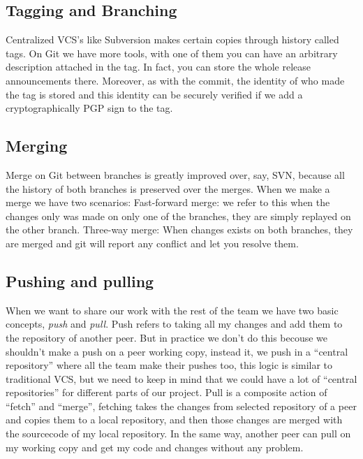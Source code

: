 \documentclass[%
	final,
	notitlepage,
	narroweqnarray,
	inline,
	twoside,
	]{ieee}
\begin{document}

\subsection{Tagging and Branching}


Centralized VCS's like Subversion makes certain copies through history called tags. 
On Git we have more tools, with one of them you can have an arbitrary 
description attached in the tag. In fact, you can store the whole release announcements there. 
Moreover, as with the commit, the identity of who made the tag is stored and this identity 
can be securely verified if we add a cryptographically PGP sign to the tag.

\subsection{Merging}

Merge on Git between branches is greatly improved over, say, SVN, because all the history of 
both branches is preserved over the merges.
When we make a merge we have two scenarios:
Fast-forward merge: we refer to this when the changes only was made on only one of the branches,
they are simply replayed on the other branch.
Three-way merge: When changes exists on both branches, they are merged and git will report any 
conflict and let you resolve them. 


\subsection{Pushing and pulling}

When we want to share our work with the rest of the team we have two basic concepts, 
\emph{push} and \emph{pull}.
Push refers to taking all my changes and add them to the repository of another peer. 
But in practice we don't do this becouse we shouldn't make a push on a peer working copy, 
instead it, we push in a ``central repository'' where all the team make their pushes too, 
this logic is similar to traditional VCS, but we need to keep in mind that we could have a 
lot of ``central repositories'' for different parts of our project.
Pull is a composite action of ``fetch'' and ``merge'', fetching takes the changes from selected 
repository of a peer and copies them to a local repository, and 
then those changes are merged with the sourcecode of my local repository.
In the same way, another peer can pull on my working copy and get my code and 
changes without any problem.
\end{document}
